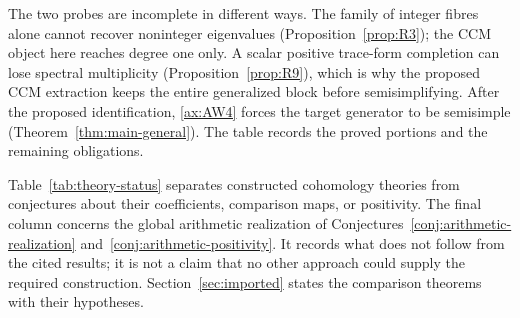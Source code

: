 \documentclass[11pt]{amsart}
\theoremstyle{plain}
\theoremstyle{definition}
\theoremstyle{remark}
\numberwithin{equation}{section}
\begin{document}
The two probes are incomplete in different ways.  The family of
integer fibres alone cannot recover noninteger eigenvalues
(Proposition~\ref{prop:R3}); the CCM object here reaches degree one
only.  A scalar positive trace-form completion can lose spectral
multiplicity (Proposition~\ref{prop:R9}), which is why the proposed
CCM extraction keeps the entire generalized block before
semisimplifying.  After the proposed identification, \ref{ax:AW4}
forces the target generator to be semisimple
(Theorem~\ref{thm:main-general}).  The table records the
proved portions and the remaining obligations.


Table~\ref{tab:theory-status} separates constructed cohomology theories
from conjectures about their coefficients, comparison maps, or positivity.
The final column concerns the global arithmetic realization of
Conjectures~\ref{conj:arithmetic-realization}
and~\ref{conj:arithmetic-positivity}. It records what does not follow
from the cited results; it is not a claim that no other approach could
supply the required construction. Section~\ref{sec:imported} states
the comparison theorems with their hypotheses.
\end{document}
